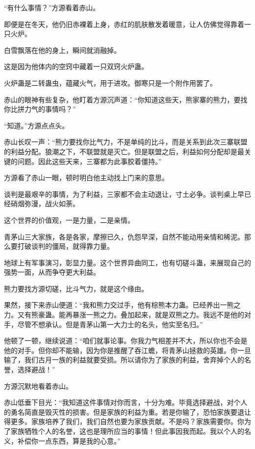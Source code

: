 
\begin{this_body}



“有什么事情？”方源看着赤山。

即便是在冬天，他仍旧赤裸着上身，赤红的肌肤散发着暖意，让人仿佛觉得靠着一只火炉。

白雪飘落在他的身上，瞬间就消融掉。

这是因为他体内的空窍中藏着一只双窍火炉蛊。

火炉蛊是二转蛊虫，蕴藏火气，用于进攻。御寒只是一个附作用罢了。

赤山的眼神有些复杂，他盯着方源沉声道：“你知道这些天，熊家寨的熊力，要找你比拼力气的事情吗？”

“知道。”方源点点头。

赤山长叹一声：“熊力要找你比气力，不是单纯的比斗，而是关系到此次三寨联盟的利益分配。狼潮之下，不联盟就是灭亡。但是联盟之后，利益如何分配却是最关键的问题。因此这些天来，三寨都为此事胶着僵持。”

方源看了赤山一眼，顿时明白他主动找上门来的意思。

谈判是最艰辛的事情，为了利益，三家都不会主动退让，寸土必争。谈判桌上早已经硝烟弥漫，战火如荼。

这个世界的价值观，一是力量，二是亲情。

青茅山三大家族，各是各家，摩擦已久，仇怨早深，自然不能动用亲情和稀泥。那么要打破谈判的僵局，就得靠力量。

地球上有军事演习，彰显力量。这个世界异曲同工，也有切磋斗蛊，来展现自己的强势一面，从而争夺更大利益。

熊力要找方源切磋，比斗气力，就是这个缘由。

果然，接下来赤山便道：“我和熊力交过手，他有棕熊本力蛊。已经养出一熊之力。又有熊豪蛊。能再暴涨一熊之力。叠加起来，就是双熊之力。我远不是他的对手，尽管不想承认。但是青茅山第一大力士的名头，他实至名归。”

他顿了一顿，继续说道：“咱们就事论事。你我力气相差并不大，所以你也不会是他的对手。但你却不能输，因为你是推醒了吞江蟾，将青茅山拯救的英雄。你一旦输了，我们古月一族的利益就要受损。所以请你为了家族的利益，舍弃掉个人的名誉，选择避战！”

方源沉默地看着赤山。

赤山低垂下目光：“我知道这件事情对你而言，十分为难。毕竟选择避战，对个人的勇名简直是毁灭性的损害。但是家族的利益为重。若是你输了，恐怕家族要退让得更多。家族培养了我们，我们自然也要为家族贡献。不是吗？家族需要你。你为了家族牺牲个人的名誉，这也是理所应当的事情！但此事因我而起。我以个人的名义，补偿你一点东西，算是我的心意。”


\end{this_body}
